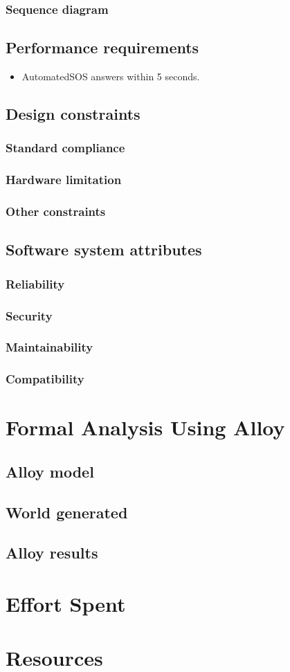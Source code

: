 \documentclass{article}
\begin{document}
\subsubsection{Sequence diagram}
\subsection{Performance requirements}
\begin{itemize}
	\item AutomatedSOS answers within 5 seconds.
\end{itemize}
\subsection{Design constraints}
\subsubsection{Standard compliance}
\subsubsection{Hardware limitation}
\subsubsection{Other constraints}
\subsection{Software system attributes}
\subsubsection{Reliability}
\subsubsection{Security}
\subsubsection{Maintainability}
\subsubsection{Compatibility}
\section{Formal Analysis Using Alloy}
\subsection{Alloy model}
\subsection{World generated}
\subsection{Alloy results}
\section{Effort Spent}
\section{Resources}
\end{document}
